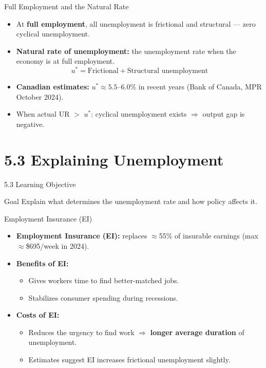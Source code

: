 \documentclass[aspectratio=169]{beamer}
\begin{document}
\begin{frame}{Full Employment and the Natural Rate}
\transfade
\begin{itemize}[<+->]
  \item At \textbf{full employment}, all unemployment is frictional and structural --- zero cyclical unemployment.
  \item \textbf{Natural rate of unemployment:} the unemployment rate when the economy is at full employment.
  \[
    u^* = \text{Frictional} + \text{Structural unemployment}
  \]
  \item \textbf{Canadian estimates:} $u^* \approx 5.5$--$6.0\%$ in recent years (Bank of Canada, MPR October 2024).
  \item When actual UR $>$ $u^*$: cyclical unemployment exists $\Rightarrow$ output gap is negative.
\end{itemize}
\end{frame}

\section{5.3 Explaining Unemployment}

\begin{frame}{5.3 Learning Objective}
\transfade
\begin{block}{Goal}
Explain what determines the unemployment rate and how policy affects it.
\end{block}
\end{frame}

\begin{frame}{Employment Insurance (EI)}
\transfade
\begin{itemize}[<+->]
  \item \textbf{Employment Insurance (EI):} replaces $\approx$55\% of insurable earnings (max $\approx$\$695/week in 2024).
  \item \textbf{Benefits of EI:}
  \begin{itemize}[<+->]
    \item Gives workers time to find better-matched jobs.
    \item Stabilizes consumer spending during recessions.
  \end{itemize}
  \item \textbf{Costs of EI:}
  \begin{itemize}[<+->]
    \item Reduces the urgency to find work $\Rightarrow$ \textbf{longer average duration} of unemployment.
    \item Estimates suggest EI increases frictional unemployment slightly.
  \end{itemize}
\end{itemize}
\end{frame}
\end{document}

